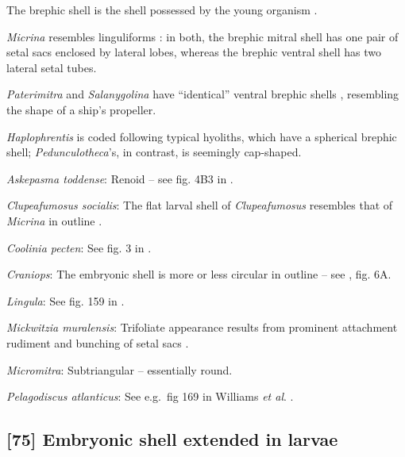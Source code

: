 \documentclass[openany]{book}
\theoremstyle{definition}
\theoremstyle{definition}
\theoremstyle{definition}
\theoremstyle{remark}
\begin{document}
The brephic shell is the shell possessed by the young organism
\citep[see][ and references therein for discussion of
terminology]{Ushatinskaya2016Revisionof}.

\emph{Micrina} resembles linguliforms \citep{Holmer2011Firstrecord}: in
both, the brephic mitral shell has one pair of setal sacs enclosed by
lateral lobes, whereas the brephic ventral shell has two lateral setal
tubes.

\emph{Paterimitra} and \emph{Salanygolina} have ``identical'' ventral
brephic shells \citep{Holmer2011Firstrecord}, resembling the shape of a
ship's propeller.

\emph{Haplophrentis} is coded following typical hyoliths, which have a
spherical brephic shell; \emph{Pedunculotheca}'s, in contrast, is
seemingly cap-shaped.

\hypertarget{Askepasma_toddense-coding-74}{}
\emph{Askepasma toddense}: Renoid -- see fig. 4B3 in
\citet{Topper2013Theoldest}.

\hypertarget{Clupeafumosus_socialis-coding-74}{}
\emph{Clupeafumosus socialis}: The flat larval shell of
\emph{Clupeafumosus} resembles that of \emph{Micrina} in outline
\citetext{\citealp{Topper2013Reappraisalof}; \citealp[cf.][]{Holmer2011Firstrecord}}.

\hypertarget{Coolinia_pecten-coding-74}{}
\emph{Coolinia pecten}: See fig. 3 in
\citet{Bassett2017Earliestontogeny}.

\hypertarget{Craniops-coding-74}{}
\emph{Craniops}: The embryonic shell is more or less circular in outline
-- see \citet{Freeman1999Changesin}, fig. 6A.

\hypertarget{Lingula-coding-74}{}
\emph{Lingula}: See fig. 159 in \citet{Williams1997Introduction}.

\hypertarget{Mickwitzia_muralensis-coding-74}{}
\emph{Mickwitzia muralensis}: Trifoliate appearance results from
prominent attachment rudiment and bunching of setal sacs
\citep{Balthasar2009Thebrachiopod}.

\hypertarget{Micromitra-coding-74}{}
\emph{Micromitra}: Subtriangular -- essentially round.

\hypertarget{Pelagodiscus_atlanticus-coding-74}{}
\emph{Pelagodiscus atlanticus}: See e.g.~fig 169 in Williams \emph{et
al}. \citeyearpar{Williams1997Introduction}.

\subsection*{{[}75{]} Embryonic shell extended in
larvae}\label{embryonic-shell-extended-in-larvae}
\end{document}

